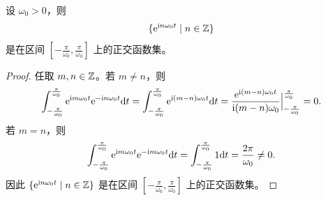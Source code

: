 \begin{example}[指数函数集]
    设 $\omega_0 > 0$，则
    \begin{align*}
        \{\mathrm{e}^{\mathrm{i} n\omega_0t} \mid n \in \mathbb{Z}\}
    \end{align*}
    是在区间 $[-\frac{\pi}{\omega_0}, \frac{\pi}{\omega_0}]$ 上的正交函数集。
\end{example}

\begin{proof}
    任取 $m, n \in \mathbb{Z}$。若 $m \neq n$，则
    \begin{align*}
        \int_{-\frac{\pi}{\omega_0}}^{\frac{\pi}{\omega_0}}\mathrm{e}^{\mathrm{i} m\omega_0t}\mathrm{e}^{-\mathrm{i} n\omega_0t}\mathrm{d}t
        = \int_{-\frac{\pi}{\omega_0}}^{\frac{\pi}{\omega_0}}\mathrm{e}^{\mathrm{i} (m - n)\omega_0t}\mathrm{d}t
        = \frac{\mathrm{e}^{\mathrm{i} (m - n)\omega_0t}}{\mathrm{i} (m - n)\omega_0}\Big|_{-\frac{\pi}{\omega_0}}^{\frac{\pi}{\omega_0}}
        = 0.
    \end{align*}
    若 $m = n$，则
    \begin{align*}
        \int_{-\frac{\pi}{\omega_0}}^{\frac{\pi}{\omega_0}}\mathrm{e}^{\mathrm{i} m\omega_0t}\mathrm{e}^{-\mathrm{i} m\omega_0t}\mathrm{d}t
        = \int_{-\frac{\pi}{\omega_0}}^{\frac{\pi}{\omega_0}}1\mathrm{d}t
        = \frac{2\pi}{\omega_0} \neq 0.
    \end{align*}
    因此 $\{\mathrm{e}^{\mathrm{i} n\omega_0t} \mid n \in \mathbb{Z}\}$ 是在区间 $[-\frac{\pi}{\omega_0}, \frac{\pi}{\omega_0}]$ 上的正交函数集。
\end{proof}



